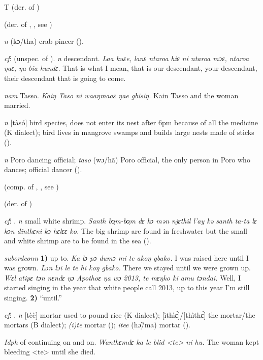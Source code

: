 \begin{letter}{T}
 (der. of ) 

 (der. of , , see ) 

 \textit{n} (kɔ/tha) crab pincer (\citealt{Pichl1967}).

 \textit{cf}:  (unspec. of ). \textit{n} descendant. \textit{Laa kuɛe, lanɛ ntaroa hiɛ ni ntaroa mɔɛ, ntaroa ŋaɛ, ŋa bia hundɛ.} That is what I mean, that is our descendant, your descendant, their descendant that is going to come.

 \textit{nam} Tasso. \textit{Kaiŋ Taso ni waaŋmaaɛ ŋae gbisiŋ.} Kain Tasso and the woman married.

 \textit{n} [tàsó] bird species, does not enter its nest after 6pm because of all the medicine (K dialect); bird lives in mangrove swamps and builds large nests made of sticks (\citealt{Pichl1967}). 

 \textit{n} Poro dancing official; \textit{taso} (wɔ/hã) Poro official, the only person in Poro who dances; official dancer (\citealt{Pichl1967}). 

 (comp. of , , see ) 

 (der. of ) 

 \textit{cf}: . \textit{n} small white shrimp. \textit{Santh bo̹m-bo̹m dɛ kɔ mən njɛthil l'ay kə santh ta-ta lɛ kɔn dinthɛni kɔ hɛlɛɛ ko.} The big shrimp are found in freshwater but the small and white shrimp are to be found in the sea (\citealt{Pichl1967}). 

 \textit{subordconn} \textbf{1)} up to. \textit{Ka lɔ pɔ dumɔ mi te akoŋ gbako.} I was raised here until I was grown. \textit{Lɔn lɔi le te hi koŋ gbako.} There we stayed until we were grown up. \textit{Wɛl atipɛ tɔn nɛndɛ ŋɔ Apothoɛ ŋa wɔ 2013, te mɛŋko ki amu tɔndai.} Well, I started singing in the year that white people call 2013, up to this year I'm still singing. \textbf{2)} “until.”

 \textit{cf}: . \textit{n} [tèè] mortar used to pound rice (K dialect); [ìthìɛ́]/[thìthɛ́] the mortar/the mortars (B dialect); \textit{(i)te} mortar (\citealt{Sumner1921}); \textit{itee} (hɔ̃/ma) mortar (\citealt{Pichl1967}). 

 \textit{Idph} of continuing on and on. \textit{Wanthɛmdɛ ka le blid <te> ni hu.} The woman kept bleeding <te> until she died.


\end{letter}
